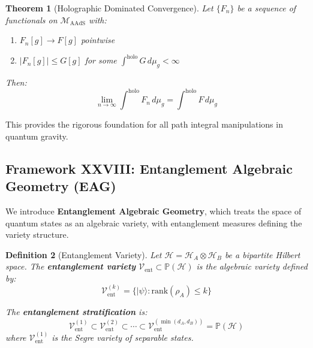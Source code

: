 \documentclass[12pt,a4paper]{article}
\newtheorem{theorem}{Theorem}[section]
\newtheorem{definition}[theorem]{Definition}
\begin{document}
\begin{theorem}[Holographic Dominated Convergence]\label{thm:holo-dominated-conv}
Let $\{F_n\}$ be a sequence of functionals on $\mathcal{M}_{\text{AAdS}}$ with:
\begin{enumerate}
    \item $F_n[g] \to F[g]$ pointwise
    \item $|F_n[g]| \leq G[g]$ for some $\int^{\text{holo}} G \, d\mu_g < \infty$
\end{enumerate}
Then:
\begin{equation}
\lim_{n \to \infty} \int^{\text{holo}} F_n \, d\mu_g = \int^{\text{holo}} F \, d\mu_g
\end{equation}
\end{theorem}

This provides the rigorous foundation for all path integral manipulations in quantum gravity.

\subsection{Framework XXVIII: Entanglement Algebraic Geometry (EAG)}
\label{subsec:entanglement-algebraic-geometry}

We introduce \textbf{Entanglement Algebraic Geometry}, which treats the space of quantum states as an algebraic variety, with entanglement measures defining the variety structure.

\begin{definition}[Entanglement Variety]\label{def:entanglement-variety}
Let $\mathcal{H} = \mathcal{H}_A \otimes \mathcal{H}_B$ be a bipartite Hilbert space. The \textbf{entanglement variety} $\mathcal{V}_{\text{ent}} \subset \mathbb{P}(\mathcal{H})$ is the algebraic variety defined by:
\begin{equation}
\mathcal{V}_{\text{ent}}^{(k)} = \{ |\psi\rangle : \text{rank}(\rho_A) \leq k \}
\end{equation}

The \textbf{entanglement stratification} is:
\begin{equation}
\mathcal{V}_{\text{ent}}^{(1)} \subset \mathcal{V}_{\text{ent}}^{(2)} \subset \cdots \subset \mathcal{V}_{\text{ent}}^{(\min(d_A, d_B))} = \mathbb{P}(\mathcal{H})
\end{equation}
where $\mathcal{V}_{\text{ent}}^{(1)}$ is the Segre variety of separable states.
\end{definition}
\end{document}
